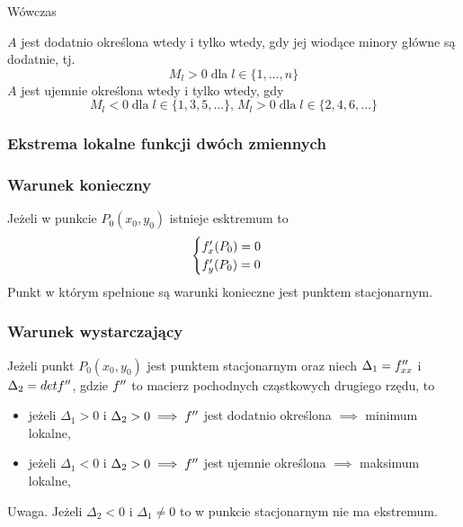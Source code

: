 \documentclass[../Matematyka.tex]{subfiles}
\begin{document}
    Wówczas\par
    \(A\) jest dodatnio określona wtedy i tylko wtedy, gdy jej wiodące minory główne są dodatnie, tj.
    \[M_l > 0\;\text{dla}\;l \in \{1,\dots,n\}\]
    \(A\) jest ujemnie określona wtedy i tylko wtedy, gdy 
    \[M_l < 0\;\text{dla}\;l \in \{1, 3, 5, \dots\}\text{,}\; M_l > 0\;\text{dla}\;l \in \{2, 4, 6, \dots\}\]

    \subsubsection{Ekstrema lokalne funkcji dwóch zmiennych}
    \subsubsection*{Warunek konieczny}
    Jeżeli w punkcie \(P_0(x_0, y_0)\) istnieje esktremum to 
    \begin{displaymath}
        \begin{cases}
            f^\prime_x(P_0) = 0 \\
            f^\prime_y(P_0) = 0
        \end{cases}
    \end{displaymath}
    Punkt w którym spełnione są warunki konieczne jest punktem stacjonarnym.

    \subsubsection*{Warunek wystarczający}
    Jeżeli punkt \(P_0(x_0, y_0)\) jest punktem stacjonarnym oraz niech \(\Delta_1=f^{\prime\prime}_{xx}\) i \(\Delta_2=detf^{\prime\prime}\), gdzie \(f^{\prime\prime}\) to macierz pochodnych cząstkowych drugiego rzędu, to
    \begin{itemize}
        \item jeżeli \(\Delta_1 > 0\) i \(\Delta_2 > 0 \implies f^{\prime\prime}\) jest dodatnio określona \(\implies\) minimum lokalne,
        \item jeżeli \(\Delta_1 < 0\) i \(\Delta_2 > 0 \implies f^{\prime\prime}\) jest ujemnie określona \(\implies\) maksimum lokalne,
    \end{itemize}

    Uwaga. Jeżeli \(\Delta_2 < 0\) i \(\Delta_1 \neq 0\) to w punkcie stacjonarnym nie ma ekstremum.
\end{document}
